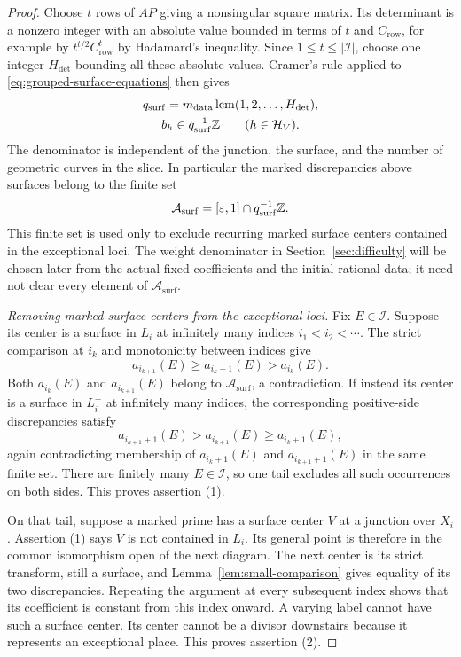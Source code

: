 \begin{proof}
Choose $t$ rows of $AP$ giving a nonsingular square matrix.  Its
determinant is a nonzero integer with an absolute value bounded in terms
of $t$ and $C_{\mathrm{row}}$, for example by
$t^{t/2}C_{\mathrm{row}}^t$ by Hadamard's inequality.  Since
$1\leq t\leq|\mathcal I|$, choose one integer $H_{\mathrm{det}}$ bounding
all these absolute values.  Cramer's rule applied to
\eqref{eq:grouped-surface-equations} then gives
\[
 \begin{gathered}
 q_{\mathrm{surf}}=
 m_{\mathrm{data}}\operatorname{lcm}(1,2,\ldots,H_{\mathrm{det}}),
 \\
 b_h\in q_{\mathrm{surf}}^{-1}\mathbb{Z}\qquad(h\in\mathcal H_V).
 \end{gathered}
\]
The denominator is independent of the junction, the surface, and the
number of geometric curves in the slice.  In particular the marked
discrepancies above surfaces belong to the finite set
\begin{equation}\label{eq:marked-surface-discrepancies}
          \mathcal A_{\mathrm{surf}}
          =[\varepsilon,1]\cap q_{\mathrm{surf}}^{-1}\mathbb{Z}.
\end{equation}
This finite set is used only to exclude recurring marked surface centers
contained in the exceptional loci.  The weight denominator in
Section~\ref{sec:difficulty} will be chosen later from the actual fixed
coefficients and the initial rational data; it need not clear every element
of $\mathcal A_{\mathrm{surf}}$.

\medskip\noindent\emph{Removing marked surface centers from the exceptional loci.}
Fix $E\in\mathcal I$.  Suppose its center is a surface in $L_i$ at
infinitely many indices $i_1<i_2<\cdots$.  The strict comparison at
$i_k$ and monotonicity between indices give
\[
                  a_{i_{k+1}}(E)\geq a_{i_k+1}(E)>a_{i_k}(E).
\]
Both $a_{i_k}(E)$ and $a_{i_{k+1}}(E)$ belong to
$\mathcal A_{\mathrm{surf}}$, a contradiction.  If instead its center is
a surface in $L_i^+$ at
infinitely many indices, the corresponding positive-side discrepancies
satisfy
\[
             a_{i_{k+1}+1}(E)>a_{i_{k+1}}(E)\geq a_{i_k+1}(E),
\]
again contradicting membership of $a_{i_k+1}(E)$ and
$a_{i_{k+1}+1}(E)$ in the same finite set.  There are finitely many
$E\in\mathcal I$, so one tail excludes all
such occurrences on both sides.  This proves assertion (1).

On that tail, suppose a marked prime has a surface center $V$ at a
junction over $X_i$.  Assertion (1) says $V$ is not contained in $L_i$.
Its general point is therefore in the common isomorphism open of the
next diagram.  The next center is its strict transform, still a surface,
and Lemma~\ref{lem:small-comparison} gives equality of its two
discrepancies.  Repeating the argument at every subsequent index shows
that its coefficient is constant from this index onward.  A varying label
cannot have such a surface center.  Its center cannot be a divisor
downstairs because it represents an exceptional place.  This proves
assertion (2).


\end{proof}
